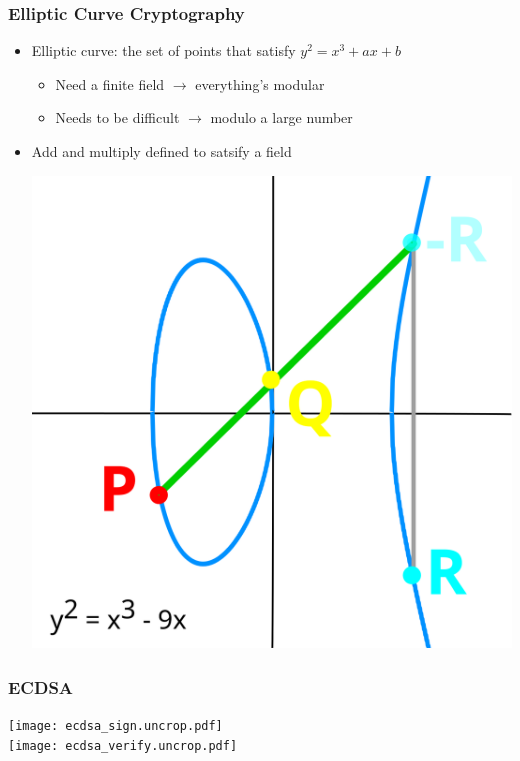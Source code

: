 \documentclass{beamer}
\begin{document}
\begin{frame}
  \frametitle{Elliptic Curve Cryptography}


  \begin{itemize}
  \item Elliptic curve: the set of points that satisfy
    $ y^2 = x^3 + ax + b $
    \begin{itemize}
    \item Need a finite field $\rightarrow$ everything's modular
    \item Needs to be difficult $\rightarrow$ modulo a large number
    \end{itemize}
  \item Add and multiply defined to satsify a field
    \begin{center}
      \includegraphics[width=0.6\linewidth]{point_add.svg}
    \end{center}
  \end{itemize}
\end{frame}

\begin{frame}
  \frametitle{ECDSA}

  \begin{center}
    \begin{multicols}{2}
      \texttt{[image: ecdsa\_sign.uncrop.pdf]} \\
      \texttt{[image: ecdsa\_verify.uncrop.pdf]} \\
    \end{multicols}
  \end{center}
\end{frame}
\end{document}
